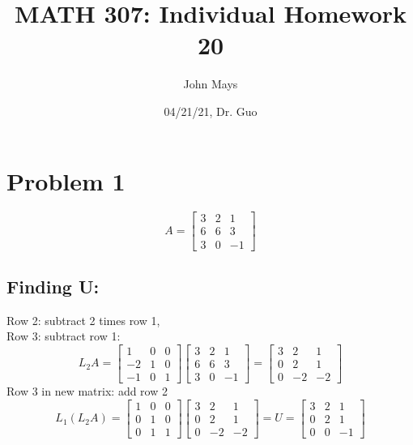 \documentclass[fleqn]{article}
\title{\textbf{MATH 307: Individual Homework 20}}
\author{John Mays}
\date{04/21/21, Dr. Guo}
\begin{document}
\maketitle


\section*{Problem 1}
\begin{equation*}
    A = \begin{bmatrix}3&2&1\\6&6&3\\3&0&-1\end{bmatrix}
\end{equation*}
\subsection*{Finding U: }
Row 2: subtract 2 times row 1,\\
Row 3: subtract row 1:
\begin{equation*}
    L_{2}A = \begin{bmatrix}1&0&0\\-2&1&0\\-1&0&1\end{bmatrix}\begin{bmatrix}3&2&1\\6&6&3\\3&0&-1\end{bmatrix} = \begin{bmatrix}3&2&1\\0&2&1\\0&-2&-2\end{bmatrix}
\end{equation*}
Row 3 in new matrix: add row 2
\begin{equation*}
    L_{1}(L_{2}A) =
    \begin{bmatrix}1&0&0\\0&1&0\\0&1&1\end{bmatrix} \begin{bmatrix}3&2&1\\0&2&1\\0&-2&-2\end{bmatrix} = U = \begin{bmatrix}3&2&1\\0&2&1\\0&0&-1\end{bmatrix}
\end{equation*}
\end{document}

